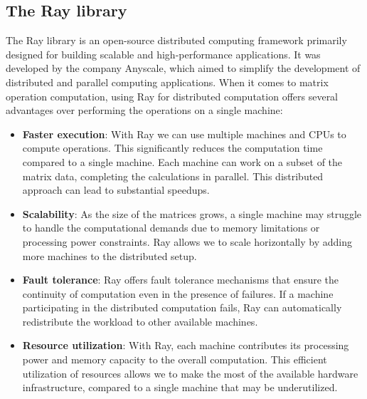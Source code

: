 \subsection{The Ray library}
The Ray library is an open-source distributed computing framework primarily designed for building scalable and high-performance applications. It was developed by the company Anyscale, which aimed to simplify the development of distributed and parallel computing applications. When it comes to matrix operation computation, using Ray for distributed computation offers several advantages over performing the operations on a single machine:
\begin{itemize}
    \item \textbf{Faster execution}: With Ray we can use multiple machines and CPUs to compute operations. This significantly reduces the computation time compared to a single machine. Each machine can work on a subset of the matrix data, completing the calculations in parallel. This distributed approach can lead to substantial speedups.
    \item \textbf{Scalability}: As the size of the matrices grows, a single machine may struggle to handle the computational demands due to memory limitations or processing power constraints. Ray allows we to scale horizontally by adding more machines to the distributed setup.
    \item \textbf{Fault tolerance}: Ray offers fault tolerance mechanisms that ensure the continuity of computation even in the presence of failures. If a machine participating in the distributed computation fails, Ray can automatically redistribute the workload to other available machines.
    \item \textbf{Resource utilization}: With Ray, each machine contributes its processing power and memory capacity to the overall computation. This efficient utilization of resources allows we to make the most of the available hardware infrastructure, compared to a single machine that may be underutilized.
\end{itemize}

